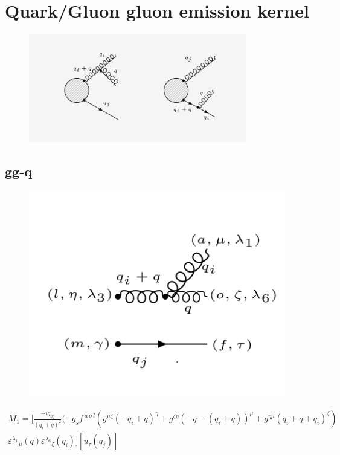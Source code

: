 \section{Quark/Gluon gluon emission kernel}

\begin{figure}[ht!]
\centering
\includegraphics[width=0.85\textwidth]{images/ggq-diagrams.png}
\end{figure}
\subsection{gg-q}
\begin{figure}[ht!]
\centering
\includegraphics[scale=0.7]{images/ggqM1.png}
\end{figure}
\begin{equation}
\begin{split}
M_1=[\frac{-ig_{{\eta}{\zeta}}}{(q_i +q)^2}(-g_s f^{\:a\:o\:l}(g^{{\mu}{\zeta}}(-q_i +q)^{\eta}+g^{{\zeta}{\eta}}(-q-(q_i +q))^{\mu}+g^{{\eta}{\mu}}(q_i +q+q_i)^{\zeta})\\
{\varepsilon^{\lambda_1}}_{\mu} (q) {\varepsilon^{\lambda_6}}_{\zeta} (q_i)][\bar{u}_{\tau}(q_j)]
\end{split}
\end{equation}

